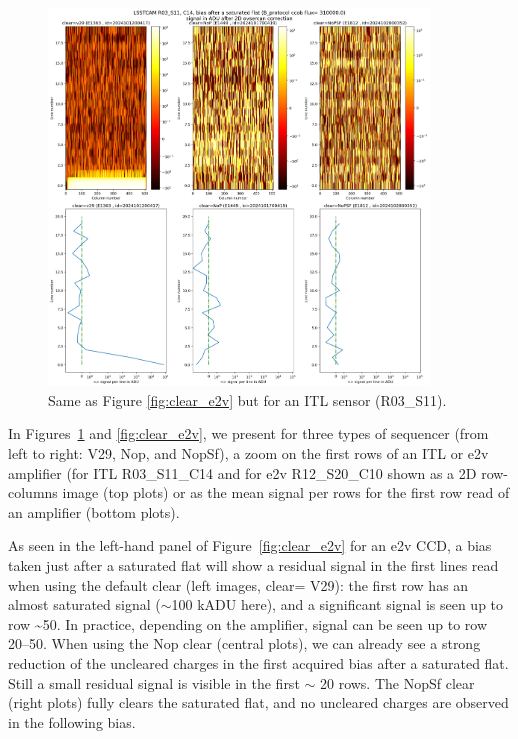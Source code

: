 \begin{figure}
\begin{centering}
\includegraphics[width=0.9\textwidth]{figures/plots_R03_S11_C14_E1812_bias_2024102800352.png}
\end{centering}
\caption{Same as Figure \ref{fig:clear_e2v} but for an ITL sensor (R03\_S11).}
\label{fig:clear_ITL}
\end{figure}


In Figures~\ref{fig:clear_ITL} and \ref{fig:clear_e2v}, we present for three types of sequencer (from left to
right: V29, Nop, and NopSf), a zoom on the first rows of an ITL or e2v
amplifier (for ITL R03\_S11\_C14 and for e2v
R12\_S20\_C10 shown as a 2D row-columns
image (top plots) or as the mean signal per rows for the first row
read of an amplifier (bottom plots).

As seen in the left-hand panel of Figure~\ref{fig:clear_e2v}
for an e2v CCD, a bias taken just after a saturated flat will show a
residual signal in the first lines read when using the default clear
(left images, clear= V29): the first row has an almost saturated signal
($\sim$100 kADU here), and a significant signal is seen up
to row \textasciitilde50. In practice, depending on the 
amplifier, signal can be seen up to row 20--50. When using the Nop clear
(central plots), we can already see a strong reduction of the uncleared
charges in the first acquired bias after a saturated flat.  Still a small
residual signal is visible in the first $\sim$ 20 rows. The
NopSf clear (right plots) fully clears the saturated flat, and no
uncleared charges are observed in the following bias.

